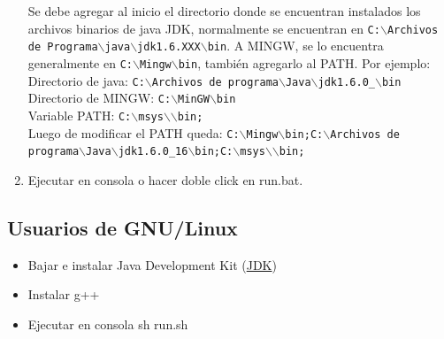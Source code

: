 \documentclass[11pt,a4paper]{article}
\begin{document}
\begin{enumerate}
        Se debe agregar al inicio el directorio donde se encuentran instalados los archivos binarios de java JDK, 
        normalmente se encuentran en 
        { \texttt {C:$\backslash$Archivos de Programa$\backslash$java$\backslash$jdk1.6.XXX$\backslash$\-bin}}.
        A MINGW, se lo encuentra generalmente en 
         {\texttt {C:$\backslash$Mingw$\backslash$bin}}, también agregarlo al PATH.
         Por ejemplo:\\
        Directorio de java: 
        {\texttt {C:$\backslash$Archivos de programa$\backslash$\-Java$\backslash$\-jdk1.6.0\-\_\-$\backslash$\-b\-in}} \\
        Directorio de MINGW: { \texttt {C:$\backslash$MinGW$\backslash$bin}}\\
        Variable PATH: 
        {\texttt {C:$\backslash$\-msys$\backslash$$\backslash$\-bin;}}\\
        Luego de modificar el PATH queda: 
        {\texttt {C:$\backslash$Mingw$\backslash$bin;C:$\backslash$Archivos de programa$\backslash$\-Java$\backslash$\-jdk1.6.0\_16$\backslash$bin;C:$\backslash$\-msys$\backslash$$\backslash$\-bin;}}
        
            
\item Ejecutar en consola o hacer doble click en run.bat.
\end{enumerate}

\subsection{Usuarios de GNU/Linux}
\begin{itemize}
\item Bajar e instalar Java Development Kit (\href{http://java.sun.com/javase/downloads/index.jsp}{JDK})
\item Instalar g++
\item Ejecutar en consola sh run.sh
\end{itemize}
  
\end{document}

